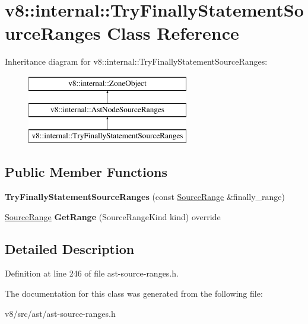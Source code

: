 \hypertarget{classv8_1_1internal_1_1TryFinallyStatementSourceRanges}{}\section{v8\+:\+:internal\+:\+:Try\+Finally\+Statement\+Source\+Ranges Class Reference}
\label{classv8_1_1internal_1_1TryFinallyStatementSourceRanges}
Inheritance diagram for v8\+:\+:internal\+:\+:Try\+Finally\+Statement\+Source\+Ranges\+:\begin{figure}[H]
\begin{center}
\leavevmode
\includegraphics[height=3.000000cm]{classv8_1_1internal_1_1TryFinallyStatementSourceRanges}
\end{center}
\end{figure}
\subsection*{Public Member Functions}
\begin{DoxyCompactItemize}
\item 
\mbox{\label{classv8_1_1internal_1_1TryFinallyStatementSourceRanges_ab6c1cfec8498f08d27d05cda61710c64}} 
{\bfseries Try\+Finally\+Statement\+Source\+Ranges} (const \mbox{\hyperlink{structv8_1_1internal_1_1SourceRange}{Source\+Range}} \&finally\+\_\+range)
\item 
\mbox{\label{classv8_1_1internal_1_1TryFinallyStatementSourceRanges_a46beb51404e9e30d528b0364e5a2bcfe}} 
\mbox{\hyperlink{structv8_1_1internal_1_1SourceRange}{Source\+Range}} {\bfseries Get\+Range} (Source\+Range\+Kind kind) override
\end{DoxyCompactItemize}


\subsection{Detailed Description}


Definition at line 246 of file ast-\/source-\/ranges.\+h.



The documentation for this class was generated from the following file\+:\begin{DoxyCompactItemize}
\item 
v8/src/ast/ast-\/source-\/ranges.\+h\end{DoxyCompactItemize}
